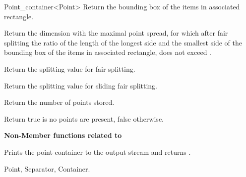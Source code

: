 \begin{ccRefClass}{Point_container<Point>}
{Return the bounding box of the items in associated rectangle.}

{Return the dimension with the maximal point spread, for which after fair splitting
the ratio of the length of the longest side and the smallest side of the bounding box of
the items in associated rectangle,
does not exceed .}

{Return the splitting value for fair splitting.}

{Return the splitting value for sliding fair splitting.}

{
Return the number of points stored.
}

{
Return true is no points are present, false otherwise.
}



\begin{ccAdvanced}

{\bf Non-Member functions related to }

\ccGlueBegin
{}
{Prints the point container  to the output stream  and returns .}
\ccGlueEnd

\end{ccAdvanced}

\ccSeeAlso

Point, Separator, Container.

\end{ccRefClass}


